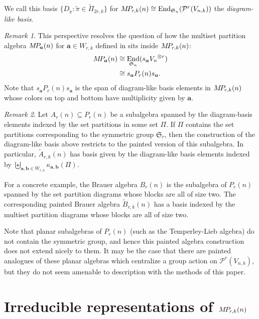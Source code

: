 \documentclass[10pt]{amsart}
\theoremstyle{definition}
\theoremstyle{definition}
\theoremstyle{plain}
\theoremstyle{remark}
\newtheorem{rema}[rema]{Remark}
\theoremstyle{plain}
\theoremstyle{plain}
\newcommand{\PP}{\mathcal{P}}
\newcommand{\SG}{\mathfrak{S}}
\newcommand{\bfa}{{\boldsymbol{a}}}
\newcommand{\bfb}{{\boldsymbol{b}}}
\newcommand{\MP}{{\rm M\!P\!}}
\newcommand{\tpi}{{\tilde{\pi}}}
\newcommand{\defn}[1]{\textcolor{defncolor}{\emph{#1}}}
\DeclareMathOperator{\End}{End}
\begin{document}
We call this basis $\{D_\tpi:\tpi\in\tilde{\Pi}_{2r,k}\}$ for $\MP_{r,k}(n)\cong\End_{\SG_n}(\PP^r(V_{n,k}))$ the \defn{diagram-like basis}.

\begin{rema} This perspective resolves the question of how the multiset partition algebra $\MP_\bfa(n)$ for $\bfa\in W_{r,k}$ defined in \cite{narayanan} sits inside $\MP_{r,k}(n)$:\begin{align*}
    \MP_{\bfa}(n)&\cong\End_{\SG_n}(s_\bfa {V_n}^{\otimes r})\\
    &\cong s_\bfa P_r(n) s_\bfa.
\end{align*} Note that $s_\bfa P_r(n) s_\bfa$ is the span of diagram-like basis elements in $\MP_{r,k}(n)$ whose colors on top and bottom have multiplicity given by $\bfa$.
\end{rema}

\begin{rema}\label{rem:other_subalgebras}
    Let $A_r(n)\subseteq P_r(n)$ be a subalgebra spanned by the diagram-basis elements indexed by the set partitions in some set $\Pi$. If $\Pi$ contains the set partitions corresponding to the symmetric group $\SG_r$, then the construction of the diagram-like basis above restricts to the painted version of this subalgebra. In particular, $\tilde{A}_{r,k}(n)$ has basis given by the diagram-like basis elements indexed by $\biguplus_{\bfa,\bfb\in W_{r,k}}\kappa_{\bfa,\bfb}(\Pi)$.

    For a concrete example, the Brauer algebra $B_r(n)$ is the subalgebra of $P_r(n)$ spanned by the set partition diagrams whose blocks are all of size two. The corresponding painted Brauer algebra $\tilde{B}_{r,k}(n)$ has a basis indexed by the multiset partition diagrams whose blocks are all of size two.

    Note that planar subalgebras of $P_r(n)$ (such as the Temperley-Lieb algebra) do not contain the symmetric group, and hence this painted algebra construction does not extend nicely to them. It may be the case that there are painted analogues of these planar algebras which centralize a group action on $\PP^r(V_{n,k})$, but they do not seem amenable to description with the methods of this paper.
\end{rema}

\section{Irreducible representations of \texorpdfstring{$\MP_{r,k}(n)$}{MP\_r,k(n)}}\label{sec:reps}
\end{document}
